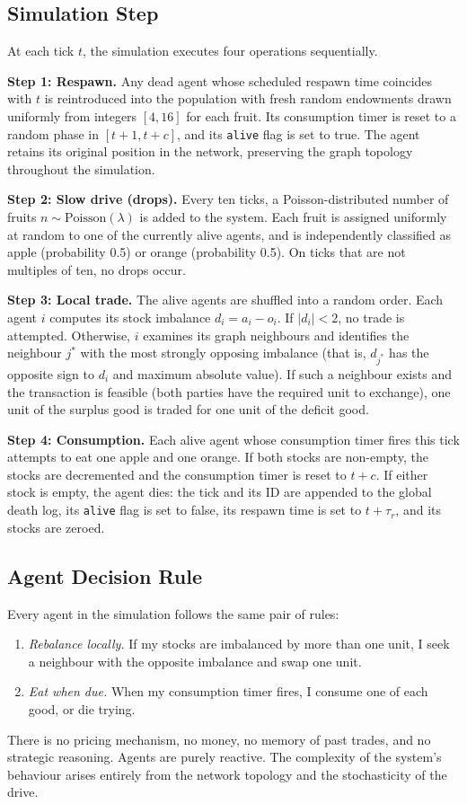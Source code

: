 \documentclass[11pt,a4paper]{article}
\begin{document}
\subsection{Simulation Step}

At each tick $t$, the simulation executes four operations sequentially.

\textbf{Step 1: Respawn.} Any dead agent whose scheduled respawn time
coincides with $t$ is reintroduced into the population with fresh random
endowments drawn uniformly from integers $[4, 16]$ for each fruit. Its
consumption timer is reset to a random phase in $[t+1, t+c]$, and its
\texttt{alive} flag is set to true. The agent retains its original position
in the network, preserving the graph topology throughout the simulation.

\textbf{Step 2: Slow drive (drops).} Every ten ticks, a Poisson-distributed
number of fruits $n \sim \text{Poisson}(\lambda)$ is added to the system.
Each fruit is assigned uniformly at random to one of the currently alive
agents, and is independently classified as apple (probability 0.5) or
orange (probability 0.5). On ticks that are not multiples of ten, no drops
occur.

\textbf{Step 3: Local trade.} The alive agents are shuffled into a random
order. Each agent $i$ computes its stock imbalance $d_i = a_i - o_i$. If
$|d_i| < 2$, no trade is attempted. Otherwise, $i$ examines its graph
neighbours and identifies the neighbour $j^*$ with the most strongly
opposing imbalance (that is, $d_{j^*}$ has the opposite sign to $d_i$ and
maximum absolute value). If such a neighbour exists and the transaction is
feasible (both parties have the required unit to exchange), one unit of the
surplus good is traded for one unit of the deficit good.

\textbf{Step 4: Consumption.} Each alive agent whose consumption timer
fires this tick attempts to eat one apple and one orange. If both stocks
are non-empty, the stocks are decremented and the consumption timer is
reset to $t + c$. If either stock is empty, the agent dies: the tick and
its ID are appended to the global death log, its \texttt{alive} flag is
set to false, its respawn time is set to $t + \tau_r$, and its stocks are
zeroed.

\subsection{Agent Decision Rule}

Every agent in the simulation follows the same pair of rules:
\begin{enumerate}
\item \emph{Rebalance locally.} If my stocks are imbalanced by more than
one unit, I seek a neighbour with the opposite imbalance and swap one
unit.
\item \emph{Eat when due.} When my consumption timer fires, I consume one
of each good, or die trying.
\end{enumerate}
There is no pricing mechanism, no money, no memory of past trades, and no
strategic reasoning. Agents are purely reactive. The complexity of the
system's behaviour arises entirely from the network topology and the
stochasticity of the drive.
\end{document}
